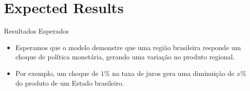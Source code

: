\documentclass[
presentation.tex
]{subfiles}
\begin{document}
\section{Expected Results}
	
	
\begin{frame}[fragile]{Resultados Esperados}
		
		\begin{itemize}
			\item Esperamos que o modelo demonstre que uma região brasileira responde um choque de política monetária, gerando uma variação no produto regional.
			\item Por exemplo, um choque de $1\%$ na taxa de juros gera uma diminuição de $x\%$ do produto de um Estado brasileiro.
		\end{itemize}
		
	\end{frame}
\end{document}
